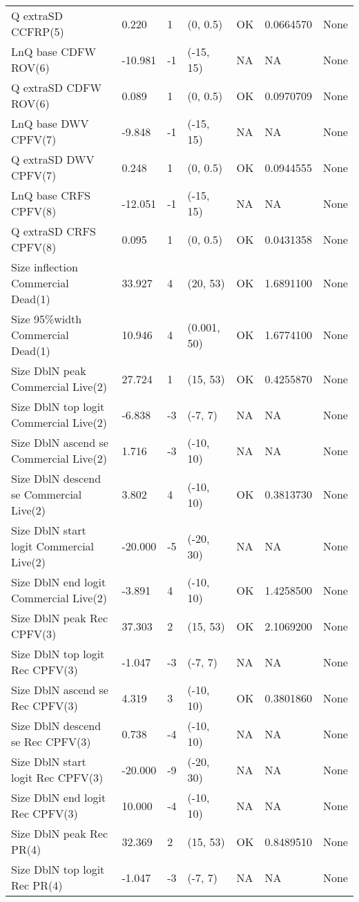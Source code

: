 \documentclass[11pt,
  english,
  letterpaper,
]{article}
\begin{document}
\begin{landscape}
\begin{longtable}[t]{>{\raggedright\arraybackslash}p{7cm}lllll>{\raggedright\arraybackslash}p{4cm}}
Q extraSD CCFRP(5) & 0.220 & 1 & (0, 0.5) & OK & 0.0664570 & None\\
LnQ base CDFW ROV(6) & -10.981 & -1 & (-15, 15) & NA & NA & None\\
Q extraSD CDFW ROV(6) & 0.089 & 1 & (0, 0.5) & OK & 0.0970709 & None\\
LnQ base DWV CPFV(7) & -9.848 & -1 & (-15, 15) & NA & NA & None\\
Q extraSD DWV CPFV(7) & 0.248 & 1 & (0, 0.5) & OK & 0.0944555 & None\\
LnQ base CRFS CPFV(8) & -12.051 & -1 & (-15, 15) & NA & NA & None\\
Q extraSD CRFS CPFV(8) & 0.095 & 1 & (0, 0.5) & OK & 0.0431358 & None\\
Size inflection Commercial Dead(1) & 33.927 & 4 & (20, 53) & OK & 1.6891100 & None\\
Size 95\%width Commercial Dead(1) & 10.946 & 4 & (0.001, 50) & OK & 1.6774100 & None\\
Size DblN peak Commercial Live(2) & 27.724 & 1 & (15, 53) & OK & 0.4255870 & None\\
Size DblN top logit Commercial Live(2) & -6.838 & -3 & (-7, 7) & NA & NA & None\\
Size DblN ascend se Commercial Live(2) & 1.716 & -3 & (-10, 10) & NA & NA & None\\
Size DblN descend se Commercial Live(2) & 3.802 & 4 & (-10, 10) & OK & 0.3813730 & None\\
Size DblN start logit Commercial Live(2) & -20.000 & -5 & (-20, 30) & NA & NA & None\\
Size DblN end logit Commercial Live(2) & -3.891 & 4 & (-10, 10) & OK & 1.4258500 & None\\
Size DblN peak Rec CPFV(3) & 37.303 & 2 & (15, 53) & OK & 2.1069200 & None\\
Size DblN top logit Rec CPFV(3) & -1.047 & -3 & (-7, 7) & NA & NA & None\\
Size DblN ascend se Rec CPFV(3) & 4.319 & 3 & (-10, 10) & OK & 0.3801860 & None\\
Size DblN descend se Rec CPFV(3) & 0.738 & -4 & (-10, 10) & NA & NA & None\\
Size DblN start logit Rec CPFV(3) & -20.000 & -9 & (-20, 30) & NA & NA & None\\
Size DblN end logit Rec CPFV(3) & 10.000 & -4 & (-10, 10) & NA & NA & None\\
Size DblN peak Rec PR(4) & 32.369 & 2 & (15, 53) & OK & 0.8489510 & None\\
Size DblN top logit Rec PR(4) & -1.047 & -3 & (-7, 7) & NA & NA & None\\

\end{longtable}
\end{landscape}
\end{document}
